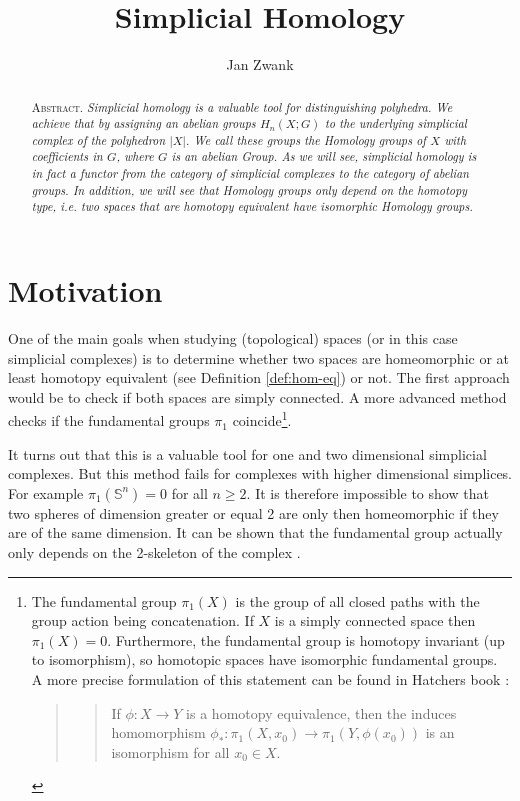 \documentclass[toc=bib]{scrartcl}
\title{Simplicial Homology}
\author{Jan Zwank}
\theoremstyle{plain}
\theoremstyle{definition}
\theoremstyle{remark}
\newcommand{\scs}{simplicial complexes}
\begin{document}
	\maketitle
	
	\begin{abstract}
		\textsc{Abstract.}\textit{
		Simplicial homology is a valuable tool for distinguishing polyhedra. We achieve that by assigning an abelian groups $H_n(X;G)$ to the underlying simplicial complex of the polyhedron $|X|$. We call these groups the Homology groups of $X$ with coefficients in $G$, where $G$ is an abelian Group. As we will see, simplicial homology is in fact a functor from the category of simplicial complexes to the category of abelian groups. In addition, we will see that Homology groups only depend on the homotopy type, i.e. two spaces that are homotopy equivalent have isomorphic Homology groups.
		}
	\end{abstract}
\clearpage
\tableofcontents

\clearpage

\section{Motivation}\label{motivation}
One of the main goals when studying (topological) spaces (or in this case \scs) is to determine whether two spaces are homeomorphic or at least homotopy equivalent (see Definition \ref{def:hom-eq}) 
or not. The first approach would be to check if both spaces are simply connected. A more advanced method checks if the fundamental groups $\pi_1$ coincide\footnote{The fundamental group $\pi_1(X)$ is the group of all closed paths with the group action being concatenation. If $X$ is a simply connected space then $\pi_1(X)=0$. Furthermore, the fundamental group is homotopy invariant (up to isomorphism), so homotopic spaces have isomorphic fundamental groups. A more precise formulation of this statement can be found in Hatchers book \parencite[Prop. 1.18, p. 37]{ha}:
\begin{quotation}
	\begin{quote}
		If $\phi: X\to Y$ is a homotopy equivalence, then the induces homomorphism $\phi_*:\pi_1(X,x_0)\to\pi_1(Y,\phi(x_0))$ is an isomorphism for all $x_0\in X$.
	\end{quote}
\end{quotation} }.

It turns out that this is a valuable tool for one and two dimensional \scs. But this method fails for complexes with higher dimensional simplices. For example $\pi_1(\mathbb{S}^n)=0$ for all $n\geq 2$. It is therefore impossible to show that two spheres of dimension greater or equal 2 are only then homeomorphic if they are of the same dimension. It can be shown that the fundamental group actually only depends on the 2-skeleton of the complex \cite[vgl.][p. 173]{ar}. 
\end{document}
